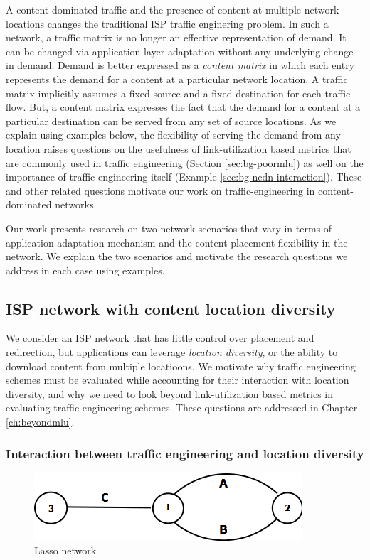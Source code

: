 A content-dominated traffic and the presence of content at multiple network locations changes the traditional ISP traffic enginering problem. In such a network, a traffic matrix is no longer an effective representation of demand. It can be changed via application-layer adaptation without any underlying change in demand. Demand is better expressed as a \emph{content matrix} in which each entry represents the demand for a content at a particular network location. A traffic matrix implicitly assumes a fixed source and a fixed destination for each traffic flow. But, a content matrix expresses the fact that the demand for a content at a particular destination can be served from any set of source locations. As we explain using examples below, the flexibility of serving the demand from any location raises questions on the usefulness of link-utilization based metrics that are commonly used in traffic engineering (Section \ref{sec:bg-poormlu}) as well on the importance of traffic engineering itself (Example \ref{sec:bg-ncdn-interaction}). These and other related questions motivate our work on traffic-engineering in content-dominated networks.

Our work presents research on two network scenarios that vary in terms of application adaptation mechanism and the content placement flexibility in the network. We explain the two scenarios and motivate the research questions we address in each case using examples.

\subsection{ISP network with content location diversity}
\label{sec:bg-locdiv}
We consider an ISP network that has little control over placement and redirection, but applications can leverage \emph{location diversity}, or  the ability to download content from multiple locatioons. We motivate why traffic engineering schemes must be evaluated while accounting for their interaction with location diversity, and why we need to look beyond link-utilization based metrics in evaluating traffic engineering schemes. These questions are addressed in Chapter \ref{ch:beyondmlu}.

\subsubsection{Interaction between traffic engineering and location diversity}
\label{sec:bg-3node}

\begin{figure}[tbh]
	\centering
	\label{fig:3node-bg}\includegraphics[scale=0.5]{final_images/Diagram3node.png}
	\caption{Lasso network}
\end{figure}

